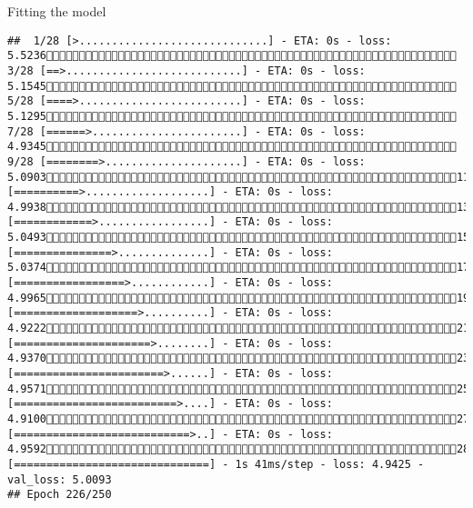 \documentclass[
  ignorenonframetext,
]{beamer}
\begin{document}
\begin{frame}[fragile]{Fitting the model}
\begin{verbatim}
##  1/28 [>.............................] - ETA: 0s - loss: 5.5236 3/28 [==>...........................] - ETA: 0s - loss: 5.1545 5/28 [====>.........................] - ETA: 0s - loss: 5.1295 7/28 [======>.......................] - ETA: 0s - loss: 4.9345 9/28 [========>.....................] - ETA: 0s - loss: 5.090311/28 [==========>...................] - ETA: 0s - loss: 4.993813/28 [============>.................] - ETA: 0s - loss: 5.049315/28 [===============>..............] - ETA: 0s - loss: 5.037417/28 [=================>............] - ETA: 0s - loss: 4.996519/28 [===================>..........] - ETA: 0s - loss: 4.922221/28 [=====================>........] - ETA: 0s - loss: 4.937023/28 [=======================>......] - ETA: 0s - loss: 4.957125/28 [=========================>....] - ETA: 0s - loss: 4.910027/28 [===========================>..] - ETA: 0s - loss: 4.959228/28 [==============================] - 1s 41ms/step - loss: 4.9425 - val_loss: 5.0093
## Epoch 226/250

\end{verbatim}
\end{frame}
\end{document}
